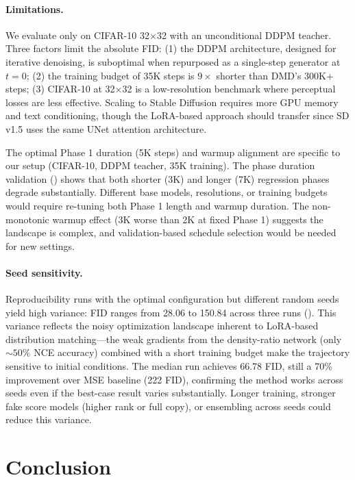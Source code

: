 \documentclass{article}
\theoremstyle{plain}
\theoremstyle{remark}
\begin{document}
\paragraph{Limitations.}
We evaluate only on CIFAR-10 32$\times$32 with an unconditional DDPM teacher. Three factors limit the absolute FID: (1) the DDPM architecture, designed for iterative denoising, is suboptimal when repurposed as a single-step generator at $t{=}0$; (2) the training budget of 35K steps is $9{\times}$ shorter than DMD's 300K+ steps; (3) CIFAR-10 at 32$\times$32 is a low-resolution benchmark where perceptual losses are less effective. Scaling to Stable Diffusion requires more GPU memory and text conditioning, though the LoRA-based approach should transfer since SD v1.5 uses the same UNet attention architecture.

The optimal Phase 1 duration (5K steps) and warmup alignment are specific to our setup (CIFAR-10, DDPM teacher, 35K training). The phase duration validation () shows that both shorter (3K) and longer (7K) regression phases degrade substantially. Different base models, resolutions, or training budgets would require re-tuning both Phase 1 length and warmup duration. The non-monotonic warmup effect (3K worse than 2K at fixed Phase 1) suggests the landscape is complex, and validation-based schedule selection would be needed for new settings.

\paragraph{Seed sensitivity.}
Reproducibility runs with the optimal configuration but different random seeds yield high variance: FID ranges from 28.06 to 150.84 across three runs (). This variance reflects the noisy optimization landscape inherent to LoRA-based distribution matching---the weak gradients from the density-ratio network (only ${\sim}50\%$ NCE accuracy) combined with a short training budget make the trajectory sensitive to initial conditions. The median run achieves 66.78 FID, still a 70\% improvement over MSE baseline (222 FID), confirming the method works across seeds even if the best-case result varies substantially. Longer training, stronger fake score models (higher rank or full copy), or ensembling across seeds could reduce this variance.

\section{Conclusion}
\label{sec:conclusion}
\end{document}
